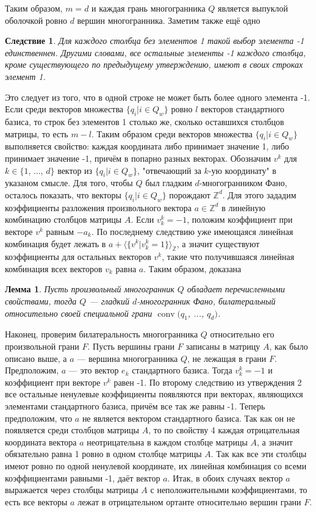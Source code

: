 \documentclass[12pt,notitlepage]{article}
\DeclareMathOperator{\conv}{conv}
\newtheorem{lemma}{Лемма}
\newtheorem*{corollary}{Следствие}
\begin{document}
	Таким образом, $m=d$ и каждая грань многогранника $Q$ является выпуклой оболочкой ровно $d$ вершин многогранника. Заметим также ещё одно
	
	\begin{corollary}
		Для каждого столбца без элементов 1 такой выбор элемента -1 единственнен. Другими словами, все остальные элементы -1 каждого столбца, кроме существующего по предыдущему утверждению, имеют в своих строках элемент 1.
	\end{corollary}
	
	Это следует из того, что в одной строке не может быть более одного элемента -1.	Если среди векторов множества $\{q_i | i \in Q_w\}$ ровно $l$ векторов стандартного базиса, то строк без элементов 1 столько же, сколько оставшихся столбцов матрицы, то есть $m-l$. Таким образом среди векторов множества $\{q_i | i \in Q_w\}$ выполняется свойство: каждая координата либо принимает значение 1, либо принимает значение -1, причём в попарно разных векторах. Обозначим $v^k$ для $k \in \{1$, ..., $d\}$ вектор из $\{q_i | i \in Q_w\}$, "отвечающий за $k$-ую координату" в указаном смысле. Для того, чтобы $Q$ был гладким $d$-многогранником Фано, осталось показать, что векторы $\{q_i | i \in Q_w\}$ порождают $\mathbb{Z}^d$. Для этого зададим коэффициенты разложения произвольного вектора $a \in \mathbb{Z}^d$ в линейную комбинацию столбцов матрицы $A$. Если $v^k_k=-1$, положим коэффициент при векторе $v^k$ равным $-a_k$. По последнему следствию уже имеющаяся линейная комбинация будет лежать в $a+\langle\{v^k|v^k_k=1\}\rangle_\mathbb{Z}$, а значит существуют коэффициенты для остальных векторов $v^k$, такие что получившаяся линейная комбинация всех векторов $v_k$ равна $a$. Таким образом, доказана
	
	\begin{lemma}
		Пусть произвольный многогранник $Q$ обладает перечисленными свойствами, тогда $Q$ --- гладкий $d$-многогранник Фано, билатеральный относительно своей специальной грани $\conv(q_1$, ..., $q_d)$.
	\end{lemma}
	
	Наконец, проверим билатеральность многогранника $Q$ относительно его произвольной грани $F$. Пусть вершины грани $F$ записаны в матрицу $A$, как было описано выше, а $a$ --- вершина многогранника $Q$, не лежащая в грани $F$. Предположим, $a$ --- это вектор $e_k$ стандартного базиса. Тогда $v^k_k=-1$ и коэффициент при векторе $v^k$ равен -1. По второму следствию из утверждения 2 все остальные ненулевые коэффициенты появляются при векторах, являющихся элементами стандартного базиса, причём все так же равны -1. Теперь предположим, что $a$ не является вектором стандартного базиса. Так как он не появляется среди столбцов матрицы $A$, то по свойству 4 каждая отрицательная координата вектора $a$ неотрицательна в каждом столбце матрицы $A$, а значит обязательно равна 1 ровно в одном столбце матрицы $A$. Так как все эти столбцы имеют ровно по одной ненулевой координате, их линейная комбинация со всеми коэффициентами равными -1, даёт вектор $a$. Итак, в обоих случаях вектор $a$ выражается через столбцы матрицы $A$ с неположительными коэффициентами, то есть все векторы $a$ лежат в отрицательном ортанте относительно вершин грани $F$.
	
\end{document}
